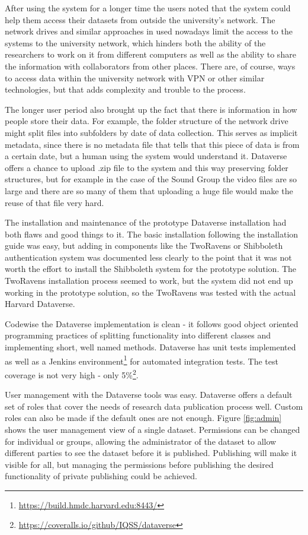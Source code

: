 After using the system for a longer time the users noted that the system could
help them access their datasets from outside the university's network. The
network drives and similar approaches in used nowadays limit the access to
the systems to the university network, which hinders both the ability of the
researchers to work on it from different computers as well as the ability to
share the information with collaborators from other places. There are, of
course, ways to access data within the university network with VPN or other
similar technologies, but that adds complexity and trouble to the process.

The longer user period also brought up the fact that there is information in
how people store their data. For example, the folder structure of the network
drive might split files into subfolders by date of data collection. This serves
as implicit metadata, since there is no metadata file that tells that this
piece of data is from a certain date, but a human using the system would
understand it. Dataverse offers a chance to upload .zip file to the system
and this way preserving folder structures, but for example in the case of
the Sound Group the video files are so large and there are so many of them
that uploading a huge file would make the reuse of that file very hard.

The installation and maintenance of the prototype Dataverse installation had
both flaws and good things to it. The basic installation following the
installation guide was easy, but adding in components like the TwoRavens or
Shibboleth authentication system was documented less clearly to the point that
it was not worth the effort to install the Shibboleth system for the prototype
solution. The TwoRavens installation process seemed to work, but the system
did not end up working in the prototype solution, so the TwoRavens was tested
with the actual Harvard Dataverse.

Codewise the Dataverse implementation is clean - it follows good object
oriented programming practices of splitting functionality into different
classes and implementing short, well named methods. Dataverse has unit
tests implemented as well as a Jenkins
environment\footnote{\url{https://build.hmdc.harvard.edu:8443/}} for automated
integration tests. The test coverage is not very high - only
5\%\footnote{\url{https://coveralls.io/github/IQSS/dataverse}}.

User management with the Dataverse tools was easy. Dataverse offers a default
set of roles that cover the needs of research data publication process well.
Custom roles can also be made if the default ones are not enough. Figure
\ref{fig:admin} shows the user management view of a single dataset. Permissions
can be changed for individual or groups, allowing the administrator of the
dataset to allow different parties to see the dataset before it is published.
Publishing will make it visible for all, but managing the permissions before
publishing the desired functionality of private publishing could be achieved.

